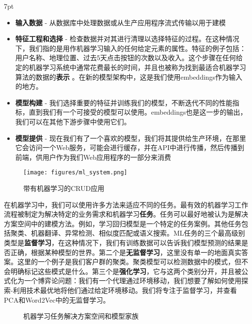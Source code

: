 \documentclass[Chinese, 11pt, table]{diazessay} %
\newenvironment{formal}{%
  \def\FrameCommand{%
	\hspace{1pt}%
	{\color{w_lightblue}\vrule width 2pt}%
	{\color{formalshade}\vrule width 4pt}%
	\colorbox{formalshade}%
  }%
  \MakeFramed{\advance\hsize-\width\FrameRestore}%
  \noindent\hspace{-4.55pt}%
  \begin{adjustwidth}{}{7pt}%
  \vspace{2pt}\vspace{2pt}%
}
{%
  \vspace{2pt}\end{adjustwidth}\endMakeFramed%
}
\begin{document}
\begin{CJK}{UTF8}{gbsn}
\begin{sloppypar}
\begin{formal}
\begin{itemize}
  \item \textbf{输入数据} - 从数据库中处理数据或从生产应用程序流式传输以用于建模
  \item \textbf{特征工程和选择} - 检查数据并对其进行清理以选择特征的过程。在这种情况下，我们指的是用作机器学习输入的任何给定元素的属性。特征的例子包括：用户名称、地理位置、过去5天点击按钮的次数以及收入。这个步骤在任何给定的机器学习系统中通常花费最长的时间，并且也被称为找到最适合机器学习算法的数据的\textbf{表示} \citep{bengio2013representation}。在新的模型架构中，这是我们使用embeddings作为输入的地方。
  \item \textbf{模型构建} - 我们选择重要的特征并训练我们的模型，不断迭代不同的性能指标，直到我们有一个可接受的模型可以使用。embeddings也是这一步的输出，我们可以在其他下游步骤中使用它们。
  \item \textbf{模型提供} - 现在我们有了一个喜欢的模型，我们将其提供给生产环境，在那里它会访问一个Web服务，可能会进行缓存，并在API中进行传播，然后传播到前端，供用户作为我们Web应用程序的一部分来消费
\end{itemize}
\end{formal}

\begin{figure}[H]
\centering
\texttt{[image: figures/ml\_system.png]}
\caption{带有机器学习的CRUD应用}
\end{figure}

在机器学习中，我们可以使用许多方法来适应不同的任务。最有效的机器学习工作流程被制定为解决特定的业务需求和机器学习\textbf{任务}。任务可以最好地被认为是解决方案空间中的建模方法。例如，学习回归模型是一个特定的任务案例。其他任务包括聚类、机器翻译、异常检测、相似度匹配或语义搜索。ML任务的三个最高级别类型是\textbf{监督学习}，在这种情况下，我们有训练数据可以告诉我们模型预测的结果是否正确，根据某种模型的世界。第二个是\textbf{无监督学习}，这里没有单一的地面真实答案。这里的一个例子是我们客户群的聚类。聚类模型可以检测数据中的模式，但不会明确标记这些模式是什么。第三个是\textbf{强化学习}，它与这两个类别分开，并且被公式化为一个博弈论问题：我们有一个代理通过环境移动，我们想要了解如何使用探索-利用技术最优地将他们通过给定环境移动。我们将专注于监督学习，并查看PCA和Word2Vec中的无监督学习。

\begin{figure}[H]
    \centering
	 \caption{机器学习任务解决方案空间和模型家族}
\end{figure}


\end{sloppypar}
\end{CJK}
\end{document}
